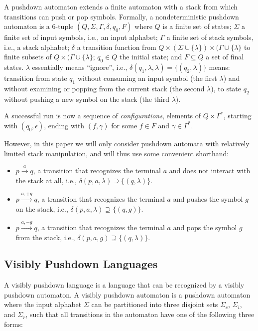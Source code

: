 \documentclass[runningheads]{llncs}
\newcommand{\T}{\Sigma} %
\begin{document}
A pushdown automaton extends a finite automaton with a stack from which transitions can push or pop symbols. Formally, a nondeterministic pushdown automaton is a 6-tuple $(Q, \T, \Gamma, \delta, q_0, F)$ where $Q$ is a finite set of states; $\T$ a finite set of input symbols, i.e., an input alphabet; $\Gamma$ a finite set of stack symbols, i.e., a stack alphabet; $\delta$ a transition function from $Q \times (\T \cup \{\lambda\}) \times (\Gamma \cup \{\lambda\}$ to finite subsets of $Q \times (\Gamma \cup \{\lambda\}$; $q_0 \in Q$ the initial state; and $F \subseteq Q$ a set of final states. $\lambda$ essentially means ``ignore'', i.e., $\delta(q_1, \lambda, \lambda) = \{(q_2, \lambda)\}$ means: transition from state $q_1$ without consuming an input symbol (the first $\lambda$) and without examining or popping from the current stack (the second $\lambda$), to state $q_2$ without pushing a new symbol on the stack (the third $\lambda$).

A successful run is now a sequence of \emph{configurations}, elements of $Q \times \Gamma^{*}$, starting with $(q_0, \epsilon)$, ending with $(f, \gamma)$ for some $f \in F$ and $\gamma \in \Gamma^{*}$.

However, in this paper we will only consider pushdown automata with relatively limited stack manipulation, and will thus use some convenient shorthand:

\begin{itemize}
\item $p \xrightarrow{a} q$, a transition that recognizes the terminal $a$ and does not interact with the stack at all, i.e., $\delta(p, a, \lambda) \supseteq \{(q, \lambda)\}$.
\item $p \xrightarrow{a, +g} q$, a transition that recognizes the terminal $a$ and pushes the symbol $g$ on the stack, i.e., $\delta(p, a, \lambda) \supseteq \{(q, g)\}$.
\item $p \xrightarrow{a, -g} q$, a transition that recognizes the terminal $a$ and pops the symbol $g$ from the stack, i.e., $\delta(p, a, g) \supseteq \{(q, \lambda)\}$.
\end{itemize}

\subsection{Visibly Pushdown Languages} \label{sec:preliminaries-vpls}

A visibly pushdown language \cite{alurVisiblyPushdownLanguages2004} is a language that can be recognized by a visibly pushdown automaton. A visibly pushdown automaton is a pushdown automaton where the input alphabet $\T$ can be partitioned into three disjoint sets $\T_c$, $\T_i$, and $\T_r$, such that all transitions in the automaton have one of the following three forms:
\end{document}
